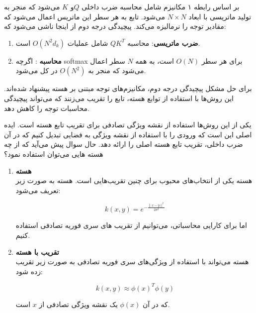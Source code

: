 \begin{qsolve}
بر اساس رابطه ۱ مکانیزم   شامل محاسبه ضرب داخلی $Q$و $K$ می‌شود که منجر به تولید ماتریسی با ابعاد $N\times N$ می‌شود. تابع  به هر سطر این ماتریس اعمال می‌شود که مقادیر توجه را نرمالیزه می‌کند. پیچیدگی درجه دوم از اینجا ناشی می‌شود که:

\begin{enumerate}
	\item \textbf{ضرب ماتریسی}: محاسبه \( QK^T \) شامل عملیات \( O(N^2d_k) \) است.
	\item \textbf{محاسبه }: اگرچه softmax برای هر سطر \( O(N) \) است، به همه \( N \) سطر اعمال می‌شود که منجر به \( O(N^2) \) در کل می‌شود.
\end{enumerate}

برای حل مشکل پیچیدگی درجه دوم، مکانیزم‌های توجه مبتنی بر هسته پیشنهاد شده‌اند. این روش‌ها با استفاده از توابع هسته، تابع  را تقریب می‌زنند که می‌تواند پیچیدگی محاسبات توجه را کاهش دهد.

یکی از این روش‌ها استفاده از نقشه ویژگی تصادفی برای تقریب تابع هسته  است. ایده اصلی این است که ورودی را با استفاده از نقشه ویژگی به فضایی تبدیل کنیم که در آن ضرب داخلی، تقریب تابع هسته اصلی را ارائه دهد. حال سوال پیش می‌آید که از چه هسته هایی می‌توان استفاده نمود؟

\begin{enumerate}
	\item \textbf{هسته }\\
هسته  یکی از انتخاب‌های محبوب برای چنین تقریب‌هایی است. هسته  به صورت زیر تعریف می‌شود:
	
	\[ k(x, y) = e^{-\frac{\|x - y\|^2}{2\sigma^2}} \]
	
اما برای کارایی محاسباتی، می‌توانیم از تقریب های سری فوریه تصادفی استفاده کنیم.


	\item \textbf{تقریب  با هسته }\\
	هسته  می‌تواند با استفاده از ویژگی‌های سری فوریه تصادفی به صورت زیر تقریب زده شود:
	
	\[ k(x, y) \approx \phi(x)^T \phi(y) \]
	
	که در آن \( \phi(x) \) یک نقشه ویژگی تصادفی از \( x \) است.
\end{enumerate}
\end{qsolve}






